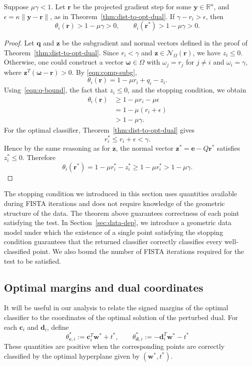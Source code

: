 \documentclass[twoside,11pt]{article}
\newcommand{\bmega}{\bm{\omega}}
\renewcommand{\c}{\bm{c}}
\renewcommand{\d}{\bm{d}}
\newcommand{\R}{{\mathbb{R}}} %
\newcommand\q{\bm{q}}
\renewcommand\r{\bm{r}}
\newcommand\w{\bm{w}}
\newcommand\y{\bm{y}}
\newcommand\z{\bm{z}}
\newcommand\e{\bm{e}}
\newcommand\mN{\mathcal{N}}
\begin{document}
\begin{theorem} \label{thm:single-point-certificate}
Suppose $\mu\gamma<1$. Let $\r$ be the projected gradient step for some $\y \in \R^n$, and $\epsilon = \kappa \|\y - \r\|$, as in Theorem~\ref{thm:dist-to-opt-dual}. If $\gamma-r_i>\epsilon$, then
\[
    \theta_i(\r)>1-\mu\gamma > 0, \qquad \theta_i(\r^*)>1-\mu\gamma>0.
\]
\end{theorem}
\begin{proof}
Let $\q$ and $\z$ be the subgradient and normal vectors defined in the proof of Theorem~\ref{thm:dist-to-opt-dual}.
Since $r_i < \gamma$ and $\z \in \mN_{\Omega}(\r)$, we have $z_i\leq0$. Otherwise, one could construct a vector $\bmega \in \Omega$ with $\omega_j = r_j$ for $j \neq i$ and $\omega_i = \gamma$, where $\z^T(\bmega - \r) > 0$. By \eqref{eqn:comp-subg},
\[
    \theta_i(\r) = 1 - \mu r_i + q_i - z_i.
\]
Using~\eqref{eqn:q-bound}, the fact that $z_i \leq 0$, and the stopping condition, we obtain
\begin{align*}
    \theta_i(\r) &\geq 1-\mu r_i-\mu\epsilon\\
                 &=1-\mu(r_i+\epsilon)\\
                 &>1-\mu\gamma.
\end{align*}
For the optimal classifier, Theorem~\ref{thm:dist-to-opt-dual} gives
\[
    r_i^* \leq r_i+\epsilon < \gamma.
\]
Hence by the same reasoning as for $\z$, the normal vector $\z^* = \e - Q\r^*$ satisfies $z_i^* \leq 0$. Therefore
\[
    \theta_i(\r^*)
    =
    1-\mu r_i^*-z_i^*
    \geq 1-\mu r_i^*
    >1-\mu\gamma.
\]
\end{proof}
The stopping condition we introduced in this section uses quantities available during FISTA iterations and does not require knowledge of the geometric structure of the data. The theorem above guarantees correctness of each point satisfying the test. In Section~\ref{sec:data-dep}, we introduce a geometric data model under which the existence of a single point satisfying the stopping condition guarantees that the returned classifier correctly classifies every well-classified point. We also bound the number of FISTA iterations required for the test to be satisfied.

\subsection{Optimal margins and dual coordinates} \label{sec:opt-margins-dual-coords}
It will be useful in our analysis to relate the signed margins of the optimal classifier to the coordinates of the optimal solution of the perturbed dual. %
For each $\c_i$ and $\d_i$, define
\[
    \theta_{\c,i}^* := \c_i^T\w^* + t^*,\qquad \theta_{\d,i}^* := -\d_i^T\w^* - t^*
\]
These quantities are positive when the corresponding points are correctly classified by the optimal hyperplane given by $(\w^*,t^*)$.
\end{document}
